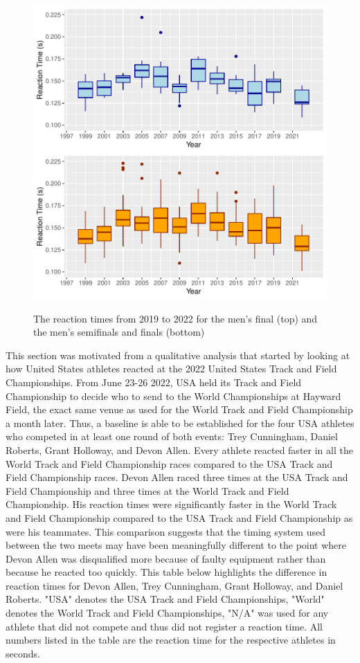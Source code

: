 \documentclass[12pt, letterpaper, titlepage]{article}
\begin{document}
\begin{figure}[tbp]
  \centering
  \includegraphics{Finals_Pooled_Boxplot}
  \label{fig:Boxplots}
  \caption{The reaction times from 2019 to 2022 for the men's final (top) and
  the men's semifinals and finals (bottom)}
\end{figure}

This section was motivated from a qualitative analysis that started by looking
at how United States athletes reacted at the 2022 United States Track and Field
Championships. From June 23-26 2022, USA held its Track
and Field Championship to decide who to send to the World Championships at Hayward 
Field, the exact same venue as used for the World Track and Field Championship a month 
later.  Thus, a baseline is able to be established for the four USA athletes who 
competed in at least one round of both events: Trey Cunningham, Daniel Roberts, 
Grant Holloway, and Devon Allen. Every athlete reacted faster in all the World 
Track and Field Championship races compared to the USA Track and Field 
Championship races. Devon Allen raced three times at the USA Track and
Field Championship and three times at the World Track and Field  Championship. 
His reaction times were significantly faster in the World Track and
Field Championship compared to the USA Track and Field Championship as were his
teammates.  This comparison suggests that the timing system used between the two
meets may have been meaningfully different to the point where Devon Allen was
disqualified more because of faulty equipment rather than because he reacted
too quickly.  This table below highlights the difference in reaction times for
Devon Allen, Trey Cunningham, Grant Holloway, and Daniel Roberts. "USA" denotes
the USA Track and Field Championships, "World" denotes the World Track and Field
Championships, "N/A" was used for any athlete that did not compete and thus
did not register a reaction time.  All numbers listed in the table are the reaction
time for the respective athletes in seconds. 
\end{document}
